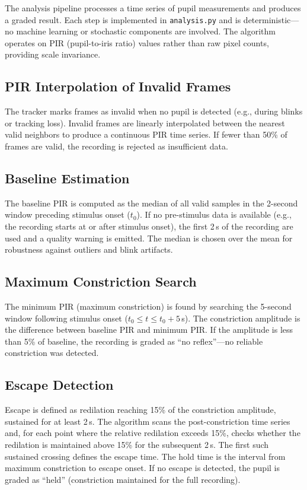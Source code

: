 \documentclass[11pt]{article}
\begin{document}
The analysis pipeline processes a time series of pupil measurements and
produces a graded result. Each step is implemented in \texttt{analysis.py}
and is deterministic---no machine learning or stochastic components are
involved. The algorithm operates on PIR (pupil-to-iris ratio) values rather
than raw pixel counts, providing scale invariance.

\subsection{PIR Interpolation of Invalid Frames}

The tracker marks frames as invalid when no pupil is detected (e.g., during
blinks or tracking loss). Invalid frames are linearly interpolated between
the nearest valid neighbors to produce a continuous PIR time series. If fewer
than 50\% of frames are valid, the recording is rejected as insufficient
data.

\subsection{Baseline Estimation}

The baseline PIR is computed as the median of all valid samples in the
2-second window preceding stimulus onset ($t_0$). If no pre-stimulus data is
available (e.g., the recording starts at or after stimulus onset), the first
2\,s of the recording are used and a quality warning is emitted. The median
is chosen over the mean for robustness against outliers and blink artifacts.

\subsection{Maximum Constriction Search}

The minimum PIR (maximum constriction) is found by searching the 5-second
window following stimulus onset ($t_0 \leq t \leq t_0 + 5$\,s). The
constriction amplitude is the difference between baseline PIR and minimum
PIR. If the amplitude is less than 5\% of baseline, the recording is graded
as ``no reflex''---no reliable constriction was detected.

\subsection{Escape Detection}

Escape is defined as redilation reaching 15\% of the constriction amplitude,
sustained for at least 2\,s. The algorithm scans the post-constriction time
series and, for each point where the relative redilation exceeds 15\%, checks
whether the redilation is maintained above 15\% for the subsequent 2\,s. The
first such sustained crossing defines the escape time. The hold time is the
interval from maximum constriction to escape onset. If no escape is detected,
the pupil is graded as ``held'' (constriction maintained for the full
recording).
\end{document}
